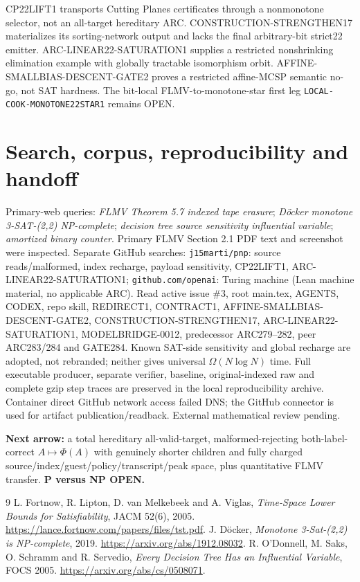 \documentclass[10pt]{article}
\begin{document}
CP22LIFT1 transports Cutting Planes certificates through a nonmonotone selector, not an all-target hereditary ARC. CONSTRUCTION-STRENGTHEN17 materializes its sorting-network output and lacks the final arbitrary-bit strict22 emitter. ARC-LINEAR22-SATURATION1 supplies a restricted nonshrinking elimination example with globally tractable isomorphism orbit. AFFINE-SMALLBIAS-DESCENT-GATE2 proves a restricted affine-MCSP semantic no-go, not SAT hardness. The bit-local FLMV-to-monotone-star first leg \texttt{LOCAL-COOK-MONOTONE22STAR1} remains OPEN.

\section{Search, corpus, reproducibility and handoff}
Primary-web queries: \emph{FLMV Theorem 5.7 indexed tape erasure}; \emph{D\"ocker monotone 3-SAT-(2,2) NP-complete}; \emph{decision tree source sensitivity influential variable}; \emph{amortized binary counter}. Primary FLMV Section 2.1 PDF text and screenshot were inspected. Separate GitHub searches: \texttt{j15marti/pnp}: source reads/malformed, index recharge, payload sensitivity, CP22LIFT1, ARC-LINEAR22-SATURATION1; \texttt{github.com/openai}: Turing machine (Lean machine material, no applicable ARC). Read active issue \#3, root main.tex, AGENTS, CODEX, repo skill, REDIRECT1, CONTRACT1, AFFINE-SMALLBIAS-DESCENT-GATE2, CONSTRUCTION-STRENGTHEN17, ARC-LINEAR22-SATURATION1, MODELBRIDGE-0012, predecessor ARC279--282, peer ARC283/284 and GATE284. Known SAT-side sensitivity and global recharge are adopted, not rebranded; neither gives universal $\Omega(N\log N)$ time. Full executable producer, separate verifier, baseline, original-indexed raw and complete gzip step traces are preserved in the local reproducibility archive. Container direct GitHub network access failed DNS; the GitHub connector is used for artifact publication/readback. External mathematical review pending.

\noindent\textbf{Next arrow:} a total hereditary all-valid-target, malformed-rejecting both-label-correct $A\mapsto\Phi(A)$ with genuinely shorter children and fully charged source/index/guest/policy/transcript/peak space, plus quantitative FLMV transfer. \textbf{P versus NP OPEN.}
\begin{thebibliography}{9}
 L. Fortnow, R. Lipton, D. van Melkebeek and A. Viglas, \emph{Time-Space Lower Bounds for Satisfiability}, JACM 52(6), 2005. \url{https://lance.fortnow.com/papers/files/tst.pdf}.
 J. D\"ocker, \emph{Monotone 3-Sat-(2,2) is NP-complete}, 2019. \url{https://arxiv.org/abs/1912.08032}.
 R. O'Donnell, M. Saks, O. Schramm and R. Servedio, \emph{Every Decision Tree Has an Influential Variable}, FOCS 2005. \url{https://arxiv.org/abs/cs/0508071}.
\end{thebibliography}
\end{document}
